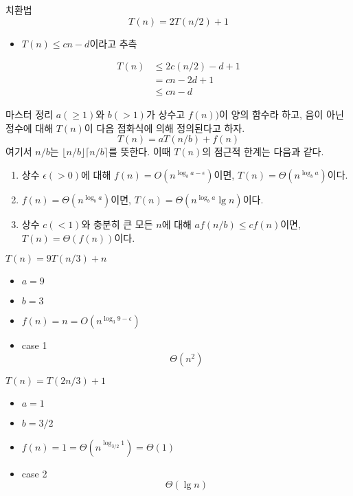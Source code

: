 \documentclass[10pt]{beamer}
\begin{document}
\begin{frame}{치환법}
    $$T(n) = 2T(n/2) + 1$$
    \begin{itemize}
        \item $T(n) \le cn - d$이라고 추측
    \end{itemize}
    \[
        \begin{aligned}
           T(n) &\le 2c(n/2)-d +1 \\
            &= cn -2d + 1 \\
            &\le cn - d
        \end{aligned}
    \]
\end{frame}


\begin{frame}{마스터 정리}
    $a(\ge 1)$와 $b(> 1)$가 상수고 $f(n))$이 양의 함수라 하고, 음이 아닌 정수에 대해 $T(n)$이 다음 점화식에 의해 정의된다고 하자.
    $$T(n) = aT(n/b) + f(n)$$
    여기서 $n/b$는 $\lfloor n/b \rfloor \lceil n/b \rceil$를 뜻한다. 이때 $T(n)$의 점근적 한계는 다음과 같다.
    \begin{enumerate}
        \item 상수 $\epsilon(>0)$에 대해 $f(n) = O(n^{\log_b a-\epsilon})$이면, $T(n) = \Theta(n^{\log_b a})$이다.
        \item $f(n) = \Theta(n^{\log_b a})$이면, $T(n) = \Theta(n^{\log_b a} \lg n)$이다.
        \item 상수 $c(<1)$와 충분히 큰 모든 $n$에 대해 $af(n/b) \le cf(n)$이면, $T(n) = \Theta(f(n))$이다.
    \end{enumerate}
\end{frame}



\begin{frame}{ex}
    $T(n) = 9T(n/3) + n$
    \begin{itemize}
        \item $a = 9$
        \item $b = 3$
        \item $f(n) = n = O(n ^{\log _3 9 - \epsilon})$
        \item case 1
        $$\Theta(n^2)$$
    \end{itemize}
     $T(n) = T(2n/3) + 1$
     \begin{itemize}
         \item $a = 1$
         \item $b = 3/2$
         \item $f(n) = 1 = \Theta(n ^{\log _{3/2}1}) = \Theta(1)$
        \item case 2
        $$\Theta(\lg n)$$
    \end{itemize}
\end{frame}
\end{document}
